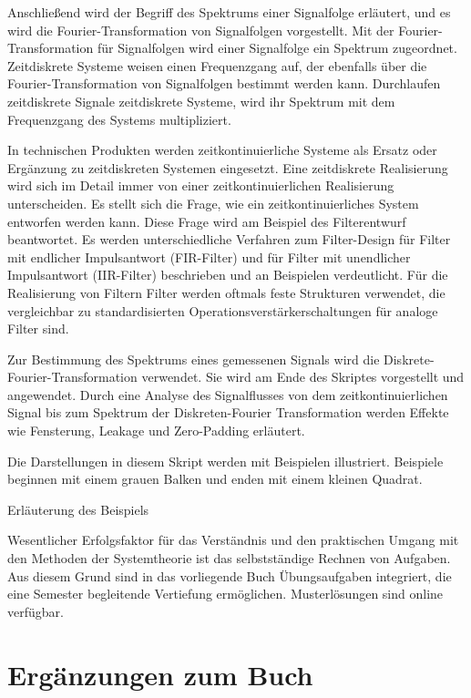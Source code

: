 Anschließend wird der Begriff des Spektrums einer Signalfolge erläutert, und es wird die Fourier-Transformation von Signalfolgen vorgestellt. Mit der Fourier-Transformation für Signalfolgen wird einer Signalfolge ein Spektrum zugeordnet. Zeitdiskrete Systeme weisen einen Frequenzgang auf, der ebenfalls über die Fourier-Transformation von Signalfolgen bestimmt werden kann. Durchlaufen zeitdiskrete Signale zeitdiskrete Systeme, wird ihr Spektrum mit dem Frequenzgang des Systems multipliziert.

In technischen Produkten werden zeitkontinuierliche Systeme als Ersatz oder Ergänzung zu zeitdiskreten Systemen eingesetzt. Eine zeitdiskrete Realisierung wird sich im Detail immer von einer zeitkontinuierlichen Realisierung unterscheiden. Es stellt sich die Frage, wie ein zeitkontinuierliches System entworfen werden kann. Diese Frage wird am Beispiel des Filterentwurf beantwortet. Es werden unterschiedliche Verfahren zum Filter-Design für Filter mit endlicher Impulsantwort (FIR-Filter) und für Filter mit unendlicher Impulsantwort (IIR-Filter) beschrieben und an Beispielen verdeutlicht. Für die Realisierung von Filtern Filter werden oftmals feste Strukturen verwendet, die vergleichbar zu standardisierten Operationsverstärkerschaltungen für analoge Filter sind.

Zur Bestimmung des Spektrums eines gemessenen Signals wird die Diskrete-Fourier-Transformation verwendet. Sie wird am Ende des Skriptes vorgestellt und angewendet. Durch eine Analyse des Signalflusses von dem zeitkontinuierlichen Signal bis zum Spektrum der Diskreten-Fourier Transformation werden Effekte wie Fensterung, Leakage und Zero-Padding erläutert.

Die Darstellungen in diesem Skript werden mit Beispielen illustriert. Beispiele beginnen mit einem grauen Balken und enden mit einem kleinen Quadrat.

\begin{example}{}
\label{example:beispiel}

Erläuterung des Beispiels

\end{example}

Wesentlicher Erfolgsfaktor für das Verständnis und den praktischen Umgang mit den Methoden der Systemtheorie ist das selbstständige Rechnen von Aufgaben. Aus diesem Grund sind in das vorliegende Buch Übungsaufgaben integriert, die eine Semester begleitende Vertiefung ermöglichen. Musterlösungen sind online verfügbar.

\section{Ergänzungen zum Buch}\label{sec:1.2}

